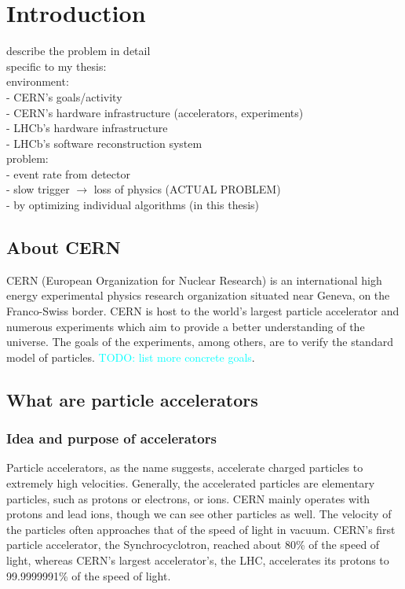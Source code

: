 \documentclass[12pt]{article}
\begin{document}
\newpage
\section{Introduction}\label{sec_intro}

\color{red}
describe the problem in detail \\
specific to my thesis: \\
environment: \\
- CERN's goals/activity \\
- CERN's hardware infrastructure (accelerators, experiments) \\
- LHCb's hardware infrastructure \\
- LHCb's software reconstruction system \\
problem: \\
- event rate from detector \\
- slow trigger $\rightarrow$ loss of physics (ACTUAL PROBLEM) \\
- by optimizing individual algorithms (in this thesis) \\
\color{black}
\vspace{1.5pc}

\subsection{About CERN}\label{sec_about_cern}

CERN (European Organization for Nuclear Research) is an international high energy experimental physics research organization situated near Geneva, on the Franco-Swiss border. CERN is host to the world's largest particle accelerator and numerous experiments which aim to provide a better understanding of the universe. The goals of the experiments, among others, are to verify the standard model of particles. \textcolor{cyan}{TODO: list more concrete goals}.
\cite{cern_about}

\subsection{What are particle accelerators}\label{sec_part_accel_intro}

\subsubsection{Idea and purpose of accelerators}\label{sec_part_accel_idea}
Particle accelerators, as the name suggests, accelerate charged particles to extremely high velocities. Generally, the accelerated particles are elementary particles, such as protons or electrons, or ions. CERN mainly operates with protons and lead ions, though we can see other particles as well. The velocity of the particles often approaches that of the speed of light in vacuum. CERN's first particle accelerator, the Synchrocyclotron, reached about 80\% of the speed of light, whereas CERN's largest accelerator's, the LHC, accelerates its protons to 99.9999991\% \cite{lhc_facts_and_figures} of the speed of light.
\end{document}
